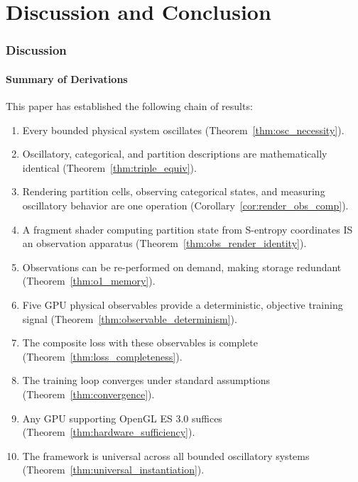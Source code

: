 \documentclass[11pt,twocolumn,a4paper]{article}
\theoremstyle{definition}
\theoremstyle{remark}
\begin{document}

\part{Discussion and Conclusion}

\section{Discussion}
\label{sec:discussion}

\subsection{Summary of Derivations}

This paper has established the following chain of results:

\begin{enumerate}[nosep]
\item Every bounded physical system oscillates (Theorem~\ref{thm:osc_necessity}).
\item Oscillatory, categorical, and partition descriptions are mathematically identical (Theorem~\ref{thm:triple_equiv}).
\item Rendering partition cells, observing categorical states, and measuring oscillatory behavior are one operation (Corollary~\ref{cor:render_obs_comp}).
\item A fragment shader computing partition state from S-entropy coordinates IS an observation apparatus (Theorem~\ref{thm:obs_render_identity}).
\item Observations can be re-performed on demand, making storage redundant (Theorem~\ref{thm:o1_memory}).
\item Five GPU physical observables provide a deterministic, objective training signal (Theorem~\ref{thm:observable_determinism}).
\item The composite loss with these observables is complete (Theorem~\ref{thm:loss_completeness}).
\item The training loop converges under standard assumptions (Theorem~\ref{thm:convergence}).
\item Any GPU supporting OpenGL ES 3.0 suffices (Theorem~\ref{thm:hardware_sufficiency}).
\item The framework is universal across all bounded oscillatory systems (Theorem~\ref{thm:universal_instantiation}).
\end{enumerate}
\end{document}
